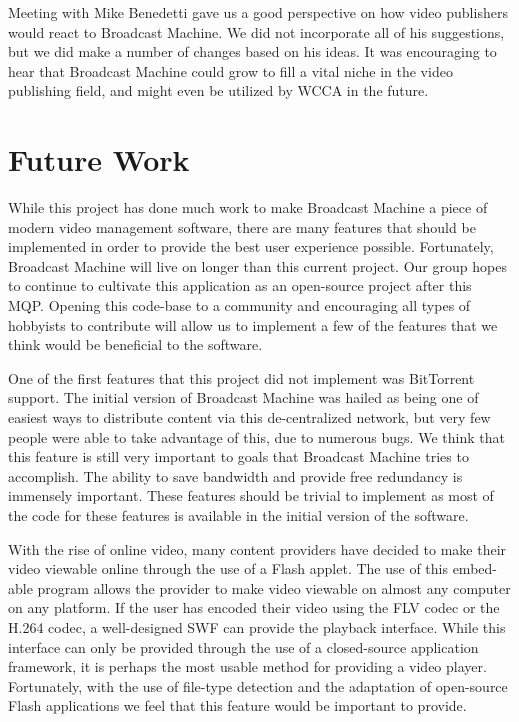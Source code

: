 \documentclass[a4paper,12pt]{report}
\begin{document}
Meeting with Mike Benedetti gave us a good perspective on how video publishers would react to Broadcast Machine. 
We did not incorporate all of his suggestions, but we did make a number of changes based on his ideas. 
It was encouraging to hear that Broadcast Machine could grow to fill a vital niche in the video publishing field, and might even be utilized by WCCA in the future.

\chapter{Future Work}
While this project has done much work to make Broadcast Machine a piece of modern video management software, there are many features that should be implemented in order to provide the best user experience possible.
Fortunately, Broadcast Machine will live on longer than this current project.
Our group hopes to continue to cultivate this application as an open-source project after this MQP.
Opening this code-base to a community and encouraging all types of hobbyists to contribute will allow us to implement a few of the features that we think would be beneficial to the software.

One of the first features that this project did not implement was BitTorrent support.
The initial version of Broadcast Machine was hailed as being one of easiest ways to distribute content via this de-centralized network, but very few people were able to take advantage of this, due to numerous bugs.
We think that this feature is still very important to goals that Broadcast Machine tries to accomplish.
The ability to save bandwidth and provide free redundancy is immensely important.
These features should be trivial to implement as most of the code for these features is available in the initial version of the software.

With the rise of online video, many content providers have decided to make their video viewable online through the use of a Flash applet.
The use of this embed-able program allows the provider to make video viewable on almost any computer on any platform.
If the user has encoded their video using the FLV codec or the H.264 codec, a well-designed SWF can provide the playback interface.
While this interface can only be provided through the use of a closed-source application framework, it is perhaps the most usable method for providing a video player.
Fortunately, with the use of file-type detection and the adaptation of open-source Flash applications we feel that this feature would be important to provide.
\end{document}
